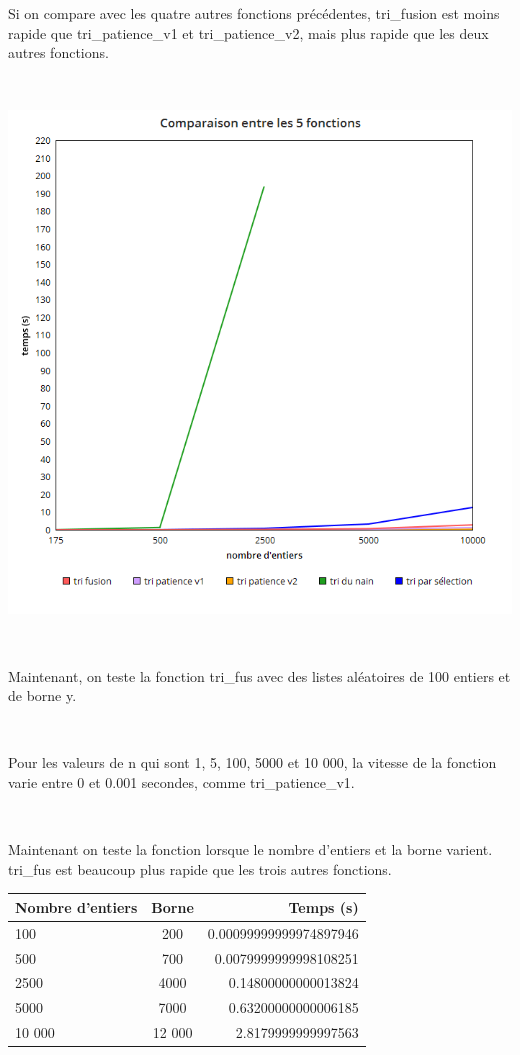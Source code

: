 \documentclass[a4paper, 12pt]{article}
\begin{document}
Si on compare avec les quatre autres fonctions précédentes, tri\_fusion est moins rapide que tri\_patience\_v1 et tri\_patience\_v2, mais plus rapide que les deux autres fonctions.

~


\begin{center}
\includegraphics[scale=0.25]{tri_fusion_comparaisonN.png}
\end{center}
~

Maintenant, on teste la fonction tri\_fus avec des listes aléatoires de 100 entiers et de borne y.

~

Pour les valeurs de n qui sont 1, 5, 100, 5000 et 10 000, la vitesse de la fonction varie entre 0 et 0.001 secondes, comme tri\_patience\_v1.

~

Maintenant on teste la fonction lorsque le nombre d'entiers et la borne varient. tri\_fus est beaucoup plus rapide que les trois autres fonctions.


\begin{table}[htbp]
  \centering
  \begin{tabular}{||l|c|r||}\hline
    \textbf{Nombre d'entiers} & \textbf{Borne} & \textbf{Temps (s)}\\\hline\hline
    100                     &    200                  & 0.00099999999974897946  \\\hline
    500                 & 700               &  0.0079999999998108251\\\hline
    2500                 & 4000             & 0.14800000000013824 \\\hline
    5000                & 7000             &  0.63200000000006185 \\\hline
    10 000                 & 12 000         & 2.8179999999997563 \\\hline
  \end{tabular}
  \label{tablepat2}
\end{table}
\end{document}
